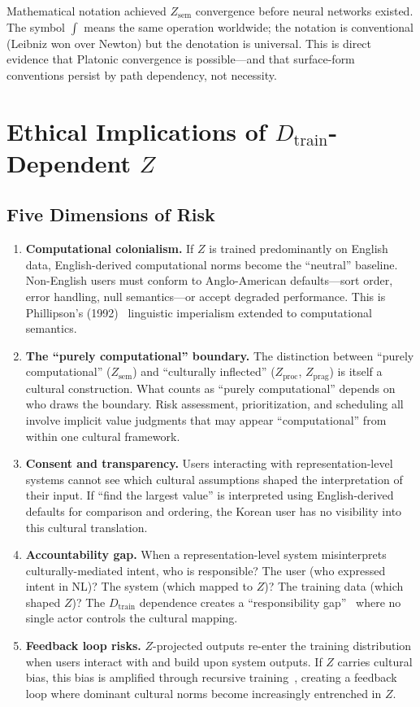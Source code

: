 \documentclass{article}
\theoremstyle{definition}
\newcommand{\Zsem}{Z_{\text{sem}}}
\newcommand{\Zproc}{Z_{\text{proc}}}
\newcommand{\Zprag}{Z_{\text{prag}}}
\newcommand{\Dtrain}{D_{\text{train}}}
\begin{document}
Mathematical notation achieved $\Zsem$ convergence before neural networks existed. The symbol $\int$ means the same operation worldwide; the notation is conventional (Leibniz won over Newton) but the denotation is universal. This is direct evidence that Platonic convergence is possible---and that surface-form conventions persist by path dependency, not necessity.

\section{Ethical Implications of $\Dtrain$-Dependent $Z$}\label{app:ethics}

\subsection{Five Dimensions of Risk}

\begin{enumerate}[nosep]
  \item \textbf{Computational colonialism.} If $Z$ is trained predominantly on English data, English-derived computational norms become the ``neutral'' baseline. Non-English users must conform to Anglo-American defaults---sort order, error handling, null semantics---or accept degraded performance. This is Phillipson's (1992)~\citep{phillipson1992} linguistic imperialism extended to computational semantics.

  \item \textbf{The ``purely computational'' boundary.} The distinction between ``purely computational'' ($\Zsem$) and ``culturally inflected'' ($\Zproc$, $\Zprag$) is itself a cultural construction. What counts as ``purely computational'' depends on who draws the boundary. Risk assessment, prioritization, and scheduling all involve implicit value judgments that may appear ``computational'' from within one cultural framework.

  \item \textbf{Consent and transparency.} Users interacting with representation-level systems cannot see which cultural assumptions shaped the interpretation of their input. If ``find the largest value'' is interpreted using English-derived defaults for comparison and ordering, the Korean user has no visibility into this cultural translation.

  \item \textbf{Accountability gap.} When a representation-level system misinterprets culturally-mediated intent, who is responsible? The user (who expressed intent in NL)? The system (which mapped to $Z$)? The training data (which shaped $Z$)? The $\Dtrain$ dependence creates a ``responsibility gap''~\citep{matthias2004} where no single actor controls the cultural mapping.

  \item \textbf{Feedback loop risks.} $Z$-projected outputs re-enter the training distribution when users interact with and build upon system outputs. If $Z$ carries cultural bias, this bias is amplified through recursive training~\citep{shumailov2024collapse}, creating a feedback loop where dominant cultural norms become increasingly entrenched in $Z$.
\end{enumerate}
\end{document}
